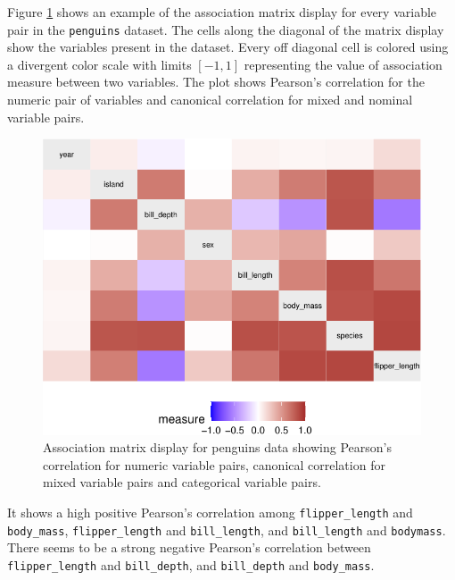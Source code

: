 Figure \ref{fig:assoc-heatmap} shows an example of the association
matrix display for every variable pair in the \texttt{penguins} dataset.
The cells along the diagonal of the matrix display show the variables
present in the dataset. Every off diagonal cell is colored using a
divergent color scale with limits \([-1,1]\) representing the value of
association measure between two variables. The plot shows Pearson's
correlation for the numeric pair of variables and canonical correlation
for mixed and nominal variable pairs.

\begin{Schunk}
\begin{figure}

{\centering \includegraphics{rj_paper_files/figure-latex/assoc-heatmap-1} 

}

\caption[Association matrix display for penguins data showing Pearson's correlation for numeric variable pairs, canonical correlation for mixed variable pairs and categorical variable pairs]{Association matrix display for penguins data showing Pearson's correlation for numeric variable pairs, canonical correlation for mixed variable pairs and categorical variable pairs.}\label{fig:assoc-heatmap}
\end{figure}
\end{Schunk}

It shows a high positive Pearson's correlation among
\texttt{flipper\_length} and \texttt{body\_mass},
\texttt{flipper\_length} and \texttt{bill\_length}, and
\texttt{bill\_length} and \texttt{bodymass}. There seems to be a strong
negative Pearson's correlation between \texttt{flipper\_length} and
\texttt{bill\_depth}, and \texttt{bill\_depth} and \texttt{body\_mass}.

